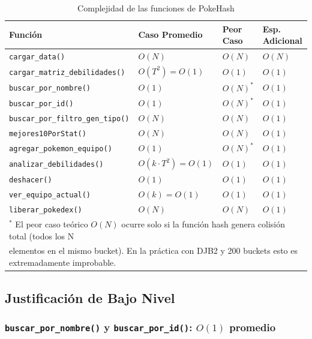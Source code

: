 \documentclass[12pt, letterpaper]{article}
\begin{document}
\begin{table}[H]
\centering
\caption{Complejidad de las funciones de PokeHash}
\renewcommand{\arraystretch}{1.3}
\begin{tabularx}{\textwidth}{@{}lXXX@{}}
\toprule
\textbf{Función} & \textbf{Caso Promedio} & \textbf{Peor Caso} & \textbf{Esp. Adicional} \\
\midrule
\texttt{cargar\_data()} & $O(N)$ & $O(N)$ & $O(N)$ \\
\texttt{cargar\_matriz\_debilidades()} & $O(T^2) = O(1)$ & $O(1)$ & $O(1)$ \\
\texttt{buscar\_por\_nombre()} & $O(1)$ & $O(N)^{*}$ & $O(1)$ \\
\texttt{buscar\_por\_id()} & $O(1)$ & $O(N)^{*}$ & $O(1)$ \\
\texttt{buscar\_por\_filtro\_gen\_tipo()} & $O(N)$ & $O(N)$ & $O(1)$ \\
\texttt{mejores10PorStat()} & $O(N)$ & $O(N)$ & $O(1)$ \\
\texttt{agregar\_pokemon\_equipo()} & $O(1)$ & $O(N)^{*}$ & $O(1)$ \\
\texttt{analizar\_debilidades()} & $O(k \cdot T^2) = O(1)$ & $O(1)$ & $O(1)$ \\
\texttt{deshacer()} & $O(1)$ & $O(1)$ & $O(1)$ \\
\texttt{ver\_equipo\_actual()} & $O(k) = O(1)$ & $O(1)$ & $O(1)$ \\
\texttt{liberar\_pokedex()} & $O(N)$ & $O(N)$ & $O(1)$ \\
\bottomrule
\multicolumn{4}{l}{\small $^{*}$ El peor caso teórico $O(N)$ ocurre solo si la función hash genera colisión total (todos los N}\\
\multicolumn{4}{l}{\small \phantom{$^{*}$} elementos en el mismo bucket). En la práctica con DJB2 y 200 buckets esto es extremadamente improbable.}
\end{tabularx}
\end{table}

\subsection{Justificación de Bajo Nivel}

\subsubsection{\texttt{buscar\_por\_nombre()} y \texttt{buscar\_por\_id()}: $O(1)$ promedio}
\end{document}
